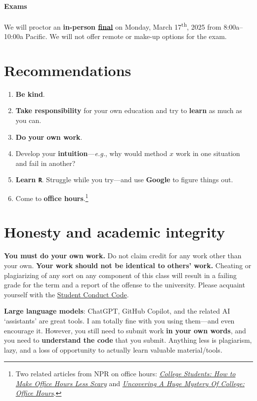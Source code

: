 \documentclass[10pt]{article}
\newcommand{\emf}[1]{\textbf{\textcolor{grass_green}{#1}}}
\begin{document}
\paragraph{Exams} We will proctor an \emf{in-person \href{https://registrar.uoregon.edu/calendars/examinations}{final}} on Monday, March 17\textsuperscript{th}, 2025 from 8:00a--10:00a Pacific. We will not offer remote or make-up options for the exam.

\section*{Recommendations}

\begin{enumerate}
  \item \emf{Be kind}.
  \item \emf{Take responsibility} for your own education and try to \emf{learn} as much as you can.
  \item \emf{Do your own work}.
  \item Develop your \emf{intuition}---\textit{e.g.}, why would method $x$ work in one situation and fail in another?
  \item \emf{Learn \texttt{R}}. Struggle while you try---and use \emf{Google} to figure things out.
  \item Come to \emf{office hours}.\footnote{Two related articles from NPR on office hours: \href{https://www.npr.org/2019/10/05/678815966/college-students-how-to-make-office-hours-less-scary}{\textit{College Students: How to Make Office Hours Less Scary}} and \href{https://www.npr.org/2019/10/02/766568824/uncovering-a-huge-mystery-of-college-office-hours}{\textit{Uncovering A Huge Mystery Of College: Office Hours}}.}
\end{enumerate}

\section*{Honesty and academic integrity}

\emf{You must do your own work.} Do not claim credit for any work other than your own. \emf{Your work should not be identical to others' work.} Cheating or plagiarizing of any sort on any component of this class will result in a failing grade for the term and a report of the offense to the university. Please acquaint yourself with the \href{http://studentlife.uoregon.edu}{Student Conduct Code}.

\textbf{Large language models}: ChatGPT, GitHub Copilot, and the related AI `assistants' are great tools. I am totally fine with you using them---and even encourage it. However, you still need to submit work \emf{in your own words}, and you need to \emf{understand the code} that you submit. Anything less is plagiarism, lazy, and a loss of opportunity to actually learn valuable material/tools.
\end{document}
